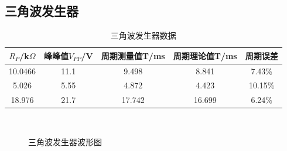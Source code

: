 \documentclass[a4paper]{article}
\begin{document}
\subsection{三角波发生器}%
\begin{table}[!h]
\centering
\caption{三角波发生器数据}
\label{data3}
\begin{tabular}{|c|c|c|c|c|}
\hline
$R_P$/k$\Omega$ & 峰峰值$V_{PP}$/V & 周期测量值T/ms & 周期理论值T/ms & 周期误差    \\ \hline
10.0466         & 11.1          & 9.498     & 8.841     & 7.43\%  \\ \hline
5.026           & 5.55          & 4.872     & 4.423     & 10.15\% \\ \hline
18.976          & 21.7          & 17.742    & 16.699    & 6.24\%  \\ \hline
\end{tabular}
\end{table}
\begin{figure}[!h]
\centering
{}\qquad
{}\qquad
{}\\
\caption{三角波发生器波形图}\label{datafig3}
\end{figure}
\end{document}
